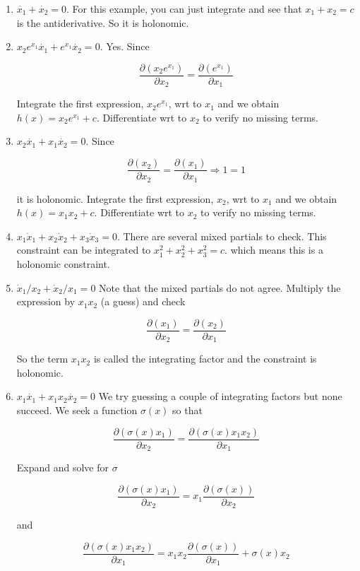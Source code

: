 \begin{enumerate}
\item
  \(\dot{x_1} + \dot{x_2} = 0\). For this example, you can just
  integrate and see that \(x_1 + x_2=c\) is the antiderivative. So it is
  holonomic.
\item
  \(x_2e^{x_1}\dot{x_1} + e^{x_1}\dot{x_2} = 0\). Yes. Since

  \[\frac{\partial (x_2e^{x_1})}{\partial x_2} =  \frac{\partial (e^{x_1})}{\partial x_1}\]

  Integrate the first expression, \(x_2e^{x_1}\), wrt to \(x_1\) and we
  obtain \(h(x) = x_2e^{x_1} + c\). Differentiate wrt to \(x_2\) to
  verify no missing terms.
\item
  \(x_2\dot{x_1} + x_1\dot{x_2} = 0\). Since

  \[\frac{\partial (x_2)}{\partial x_2} =  \frac{\partial (x_1)}{\partial x_1} \Rightarrow 1 = 1\]

  it is holonomic. Integrate the first expression, \(x_2\), wrt to
  \(x_1\) and we obtain \(h(x) = x_1x_2 + c\). Differentiate wrt to
  \(x_2\) to verify no missing terms.
\item
  \(x_1 \dot{x}_1 + x_2 \dot{x}_2 + x_3 \dot{x}_3 = 0\). There are
  several mixed partials to check. This constraint can be integrated to
  \(x_1^2 + x_2^2 + x_3^2 = c\). which means this is a holonomic
  constraint.
\item
  \(\dot{x}_1/x_2 + \dot{x}_2 / x_1 = 0\) Note that the mixed partials
  do not agree. Multiply the expression by \(x_1x_2\) (a guess) and
  check

  \[\frac{\partial (x_1)}{\partial x_2} =  \frac{\partial (x_2)}{\partial x_1}\]

  So the term \(x_1x_2\) is called the integrating factor and the
  constraint is holonomic.
\item
  \(x_1\dot{x_1} + x_1x_2\dot{x_2} = 0\) We try guessing a couple of
  integrating factors but none succeed. We seek a function \(\sigma(x)\)
  so that

  \[\frac{\partial (\sigma (x) x_1)}{\partial x_2} =  \frac{\partial (\sigma(x)x_1 x_2)}{\partial x_1}\]

  Expand and solve for \(\sigma\)

  \[\frac{\partial (\sigma (x) x_1)}{\partial x_2} = x_1 \frac{\partial (\sigma (x))}{\partial x_2}\]

  and

  \[\frac{\partial (\sigma(x)x_1 x_2)}{\partial x_1} = x_1 x_2\frac{\partial (\sigma (x))}{\partial x_1} + \sigma(x) x_2\]


\end{enumerate}
